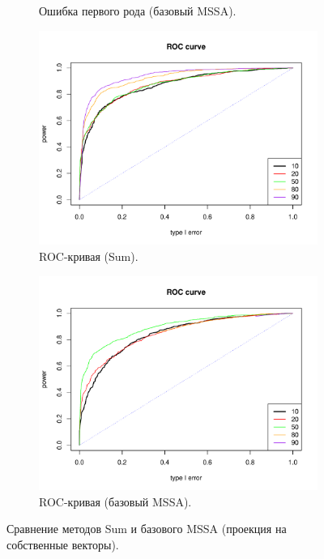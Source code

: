 \documentclass[specialist,
substylefile = spbu_report.rtx,
subf,href,colorlinks=true, 12pt]{disser}
\theoremstyle{definition}
\begin{document}
\begin{figure}
\begin{subfigure}[t]{0.45\textwidth}
			\caption{Ошибка первого рода (базовый MSSA).}
		\end{subfigure}
		\bigskip
		\begin{subfigure}[t]{0.45\textwidth}
			\centering
			\includegraphics[width=\textwidth]{roc_sum_ev.pdf}
			\caption{ROC-кривая (Sum).}
		\end{subfigure}\hspace{\fill}
		\begin{subfigure}[t]{0.45\textwidth}
			\centering
			\includegraphics[width=\textwidth]{roc_mssa_ev.pdf}
			\caption{ROC-кривая (базовый MSSA).}
		\end{subfigure}
		\caption{Сравнение методов Sum и базового MSSA (проекция на собственные векторы).}
		\label{fig:sum_ev}\textsc{}
	\end{figure}
\end{document}
